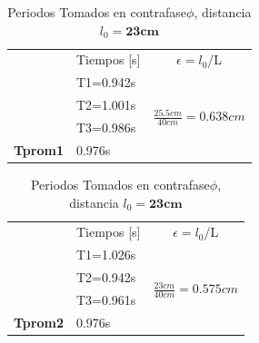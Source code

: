 \documentclass{article}
\begin{document}
\begin{table}[H]
    \begin{subtable}{.5\linewidth}
      \centering 
        \begin{tabular}{@{}l|l|l|@{}}
\cmidrule(l){2-3}
\multicolumn{1}{c|}{} & \multicolumn{1}{c|}{Tiempos [s]} & \multicolumn{1}{c|}{$\epsilon=l_{0}$/L}     \\ \cmidrule(l){2-3} 
                      & T1=0.942s                        & \multirow{4}{*}{$\frac{25.5cm}{40cm}=0.638cm$} \\ \cmidrule(lr){2-2}
                      & T2=1.001s                        &                                \\ \cmidrule(lr){2-2}
                      & T3=0.986s                        &                                \\ \cmidrule(lr){2-2}
\textbf{Tprom1}       & 0.976s                           &                                \\ \cmidrule(l){2-3} 
\end{tabular}
\caption{Periodos Tomados en contrafase$\phi$, distancia $l_{0}=25.5cm$}
\label{contrafase1}
    \end{subtable}%
    \begin{subtable}{.8\linewidth}
      \centering
        \begin{tabular}{@{}l|l|l|@{}}
		\cmidrule(l){2-3}
\multicolumn{1}{c|}{} & \multicolumn{1}{c|}{Tiempos [s]} & \multicolumn{1}{c|}{$\epsilon=l_{0}$/L}       \\ \cmidrule(l){2-3} 
                      & T1=1.026s                        & \multirow{4}{*}{$\frac{23cm}{40cm}=0.575cm$}  \\ \cmidrule(lr){2-2}
                      & T2=0.942s                        &                                                 \\ \cmidrule(lr){2-2}
                      & T3=0.961s                        &                                  				 \\ \cmidrule(lr){2-2}
	\textbf{Tprom2}   & 0.976s                           &               				                      \\ \cmidrule(l){2-3} 
\end{tabular}
\caption{Periodos Tomados en contrafase$\phi$, distancia $l_{0}=\textbf{23cm}$}
\label{contrafase1-2}
    \end{subtable}     
    \begin{subtable}{.5\linewidth}
      \centering

\end{subtable}
\end{table}
\end{document}
